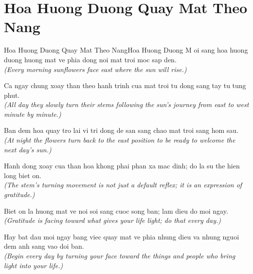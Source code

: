 \section{Hoa Huong Duong Quay Mat Theo Nang}
\begin{truyen}{Hoa Huong Duong Quay Mat Theo Nang}{Hoa Huong Duong}
M oi sang hoa huong duong huong mat ve phia dong noi mat troi moc sap den.\\
\textit{(Every morning sunflowers face east where the sun will rise.)}

Ca ngay chung xoay than theo hanh trinh cua mat troi tu dong sang tay tu tung phut.\\
\textit{(All day they slowly turn their stems following the sun's journey from east to west minute by minute.)}

Ban dem hoa quay tro lai vi tri dong de san sang chao mat troi sang hom sau.\\
\textit{(At night the flowers turn back to the east position to be ready to welcome the next day's sun.)}

Hanh dong xoay cua than hoa khong phai phan xa mac dinh; do la su the hien long biet on.\\
\textit{(The stem's turning movement is not just a default reflex; it is an expression of gratitude.)}

Biet on la huong mat ve noi soi sang cuoc song ban; lam dieu do moi ngay.\\
\textit{(Gratitude is facing toward what gives your life light; do that every day.)}

\end{truyen}
\begin{baihoc}
  Hay bat dau moi ngay bang viec quay mat ve phia nhung dieu va nhung nguoi dem anh sang vao doi ban.\\
  \textit{(Begin every day by turning your face toward the things and people who bring light into your life.)}
\end{baihoc}

